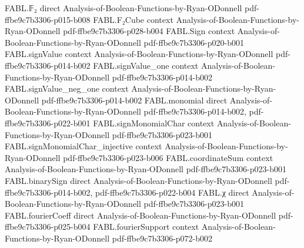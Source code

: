 \begin{theorem}
\label{FABL.exists_odd_restrictionFourierCoeff}
\leanok
{}
\proofstep
  {FABL.𝔽₂}
  {direct}
  {Analysis-of-Boolean-Functions-by-Ryan-ODonnell}
  {pdf-ffbe9c7b3306-p015-b008}
\proofstep
  {FABL.F₂Cube}
  {context}
  {Analysis-of-Boolean-Functions-by-Ryan-ODonnell}
  {pdf-ffbe9c7b3306-p028-b004}
\proofstep
  {FABL.Sign}
  {context}
  {Analysis-of-Boolean-Functions-by-Ryan-ODonnell}
  {pdf-ffbe9c7b3306-p020-b001}
\proofstep
  {FABL.signValue}
  {context}
  {Analysis-of-Boolean-Functions-by-Ryan-ODonnell}
  {pdf-ffbe9c7b3306-p014-b002}
\proofstep
  {FABL.signValue_one}
  {context}
  {Analysis-of-Boolean-Functions-by-Ryan-ODonnell}
  {pdf-ffbe9c7b3306-p014-b002}
\proofstep
  {FABL.signValue_neg_one}
  {context}
  {Analysis-of-Boolean-Functions-by-Ryan-ODonnell}
  {pdf-ffbe9c7b3306-p014-b002}
\proofstep
  {FABL.monomial}
  {direct}
  {Analysis-of-Boolean-Functions-by-Ryan-ODonnell}
  {pdf-ffbe9c7b3306-p014-b002,
    pdf-ffbe9c7b3306-p022-b001}
\proofstep
  {FABL.signMonomialChar}
  {context}
  {Analysis-of-Boolean-Functions-by-Ryan-ODonnell}
  {pdf-ffbe9c7b3306-p023-b001}
\proofstep
  {FABL.signMonomialChar_injective}
  {context}
  {Analysis-of-Boolean-Functions-by-Ryan-ODonnell}
  {pdf-ffbe9c7b3306-p023-b006}
\proofstep
  {FABL.coordinateSum}
  {context}
  {Analysis-of-Boolean-Functions-by-Ryan-ODonnell}
  {pdf-ffbe9c7b3306-p023-b001}
\proofstep
  {FABL.binarySign}
  {direct}
  {Analysis-of-Boolean-Functions-by-Ryan-ODonnell}
  {pdf-ffbe9c7b3306-p014-b002,
    pdf-ffbe9c7b3306-p022-b004}
\proofstep
  {FABL.χ}
  {direct}
  {Analysis-of-Boolean-Functions-by-Ryan-ODonnell}
  {pdf-ffbe9c7b3306-p023-b001}
\proofstep
  {FABL.fourierCoeff}
  {direct}
  {Analysis-of-Boolean-Functions-by-Ryan-ODonnell}
  {pdf-ffbe9c7b3306-p025-b004}
\proofstep
  {FABL.fourierSupport}
  {context}
  {Analysis-of-Boolean-Functions-by-Ryan-ODonnell}
  {pdf-ffbe9c7b3306-p072-b002}

\end{theorem}
